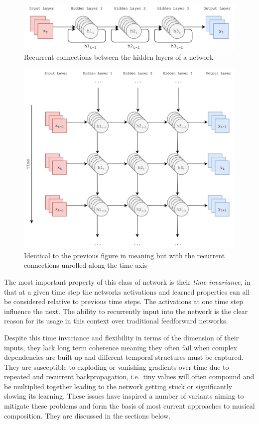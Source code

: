 \documentclass[12pt,]{article}
\begin{document}
\begin{figure}
\centering
\includegraphics{Images/rnn.png}
\caption{Recurrent connections between the hidden layers of a network}
\end{figure}

\begin{figure}
\centering
\includegraphics{Images/unrolledrnn.png}
\caption{Identical to the previous figure in meaning but with the
recurrent connections unrolled along the time axis}
\end{figure}

The most important property of this class of network is their \emph{time
invariance}, in that at a given time step the networks activations and
learned properties can all be considered relative to previous time
steps. The activations at one time step influence the next. The ability
to recurrently input into the network is the clear reason for its usage
in this context over traditional feedforward networks.

Despite this time invariance and flexibility in terms of the dimension
of their inputs, they lack long term coherence meaning they often fail
when complex dependencies are built up and different temporal structures
must be captured. They are susceptible to exploding or vanishing
gradients over time due to repeated and recurrent backpropagation,
i.e.~tiny values will often compound and be multiplied together leading
to the network getting stuck or significantly slowing its learning.
These issues have inspired a number of variants aiming to mitigate these
problems and form the basis of most current approaches to musical
composition. They are discussed in the sections below.
\end{document}
